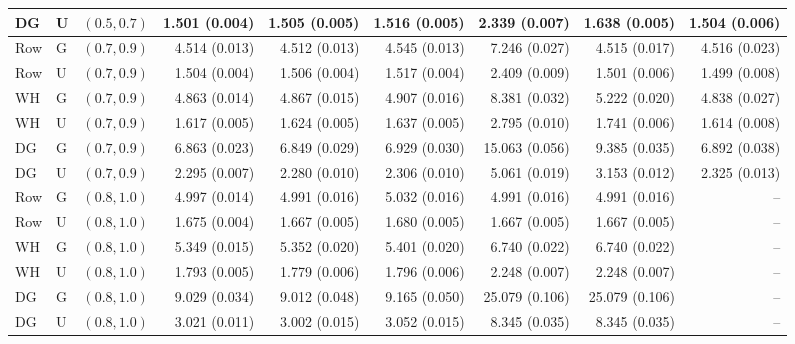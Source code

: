 \documentclass{article}
\theoremstyle{plain}
\theoremstyle{definition}
\theoremstyle{definition}
\begin{document}
\begin{table}[p]
\begin{tabular}{@{}lllrrrrrr@{}}
DG & U & $(0.5,0.7)$ & 1.501 (0.004) & 1.505 (0.005) & 1.516 (0.005) & 2.339 (0.007) & 1.638 (0.005) & 1.504 (0.006) \\
\midrule
Row & G & $(0.7,0.9)$ & 4.514 (0.013) & 4.512 (0.013) & 4.545 (0.013) & 7.246 (0.027) & 4.515 (0.017) & 4.516 (0.023) \\
Row & U & $(0.7,0.9)$ & 1.504 (0.004) & 1.506 (0.004) & 1.517 (0.004) & 2.409 (0.009) & 1.501 (0.006) & 1.499 (0.008) \\
WH & G & $(0.7,0.9)$ & 4.863 (0.014) & 4.867 (0.015) & 4.907 (0.016) & 8.381 (0.032) & 5.222 (0.020) & 4.838 (0.027) \\
WH & U & $(0.7,0.9)$ & 1.617 (0.005) & 1.624 (0.005) & 1.637 (0.005) & 2.795 (0.010) & 1.741 (0.006) & 1.614 (0.008) \\
DG & G & $(0.7,0.9)$ & 6.863 (0.023) & 6.849 (0.029) & 6.929 (0.030) & 15.063 (0.056) & 9.385 (0.035) & 6.892 (0.038) \\
DG & U & $(0.7,0.9)$ & 2.295 (0.007) & 2.280 (0.010) & 2.306 (0.010) & 5.061 (0.019) & 3.153 (0.012) & 2.325 (0.013) \\
\midrule
Row & G & $(0.8,1.0)$ & 4.997 (0.014) & 4.991 (0.016) & 5.032 (0.016) & 4.991 (0.016) & 4.991 (0.016) & -- \\
Row & U & $(0.8,1.0)$ & 1.675 (0.004) & 1.667 (0.005) & 1.680 (0.005) & 1.667 (0.005) & 1.667 (0.005) & -- \\
WH & G & $(0.8,1.0)$ & 5.349 (0.015) & 5.352 (0.020) & 5.401 (0.020) & 6.740 (0.022) & 6.740 (0.022) & -- \\
WH & U & $(0.8,1.0)$ & 1.793 (0.005) & 1.779 (0.006) & 1.796 (0.006) & 2.248 (0.007) & 2.248 (0.007) & -- \\
DG & G & $(0.8,1.0)$ & 9.029 (0.034) & 9.012 (0.048) & 9.165 (0.050) & 25.079 (0.106) & 25.079 (0.106) & -- \\
DG & U & $(0.8,1.0)$ & 3.021 (0.011) & 3.002 (0.015) & 3.052 (0.015) & 8.345 (0.035) & 8.345 (0.035) & -- \\
\bottomrule
\end{tabular}




\end{table}
\end{document}
